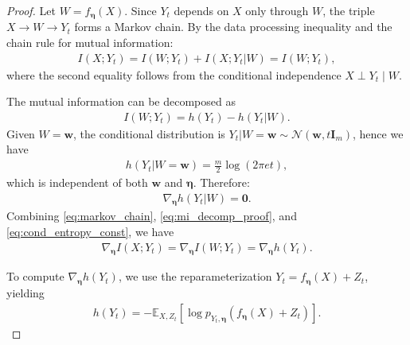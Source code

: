 \documentclass[10pt,a4paper]{amsart}
\newcommand{\E}{\mathbb{E}}
\newcommand{\Yt}{Y_t}
\newcommand{\bI}{\bm{I}}
\begin{document}
\begin{proof}
Let $W = f_{\bm \eta}(X)$. Since $\Yt$ depends on $X$ only through $W$, the triple $X \to W \to \Yt$ forms a Markov chain. By the data processing inequality and the chain rule for mutual information:
\begin{align}
I(X; \Yt) = I(W; \Yt) + I(X; \Yt|W) = I(W; \Yt),
\label{eq:markov_chain}
\end{align}
where the second equality follows from the conditional independence $X \perp \Yt \mid W$.

The mutual information can be decomposed as
\begin{align}
I(W; \Yt) = h(\Yt) - h(\Yt|W).
\label{eq:mi_decomp_proof}
\end{align}
Given $W = \bm w$, the conditional distribution is $\Yt|W=\bm w \sim \mathcal{N}(\bm w, t\bI_m)$, 
hence we have
\begin{align}
h(\Yt|W=\bm{w}) = \frac{m}{2}\log(2\pi e t),
\end{align}
which is independent of both $\bm w$ and $\bm \eta$. Therefore:
\begin{align}
\nabla_{\bm \eta} h(\Yt|W) = \bm{0}.
\label{eq:cond_entropy_const}
\end{align}
Combining \eqref{eq:markov_chain}, \eqref{eq:mi_decomp_proof}, and \eqref{eq:cond_entropy_const},
we have
\begin{align}
\nabla_{\bm \eta} I(X; \Yt) = \nabla_{\bm \eta} I(W; \Yt) = \nabla_{\bm \eta} h(\Yt).
\label{eq:grad_mi_equals_grad_h}
\end{align}

To compute $\nabla_{\bm \eta} h(\Yt)$, we use the reparameterization $\Yt = f_{\bm \eta}(X) + Z_t$,
yielding 
\begin{align}
h(\Yt) = -\E_{X,Z_t}\left[\log p_{\Yt,\bm \eta}(f_{\bm \eta}(X) + Z_t)\right].
\end{align}


\end{proof}
\end{document}
